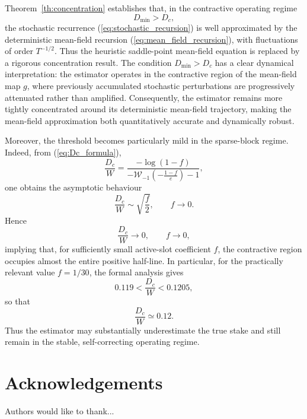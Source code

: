 \documentclass[10pt]{iopart}
\newcommand{\1}{\mathbf{1}}
\begin{document}
Theorem~\ref{th:concentration} establishes that, in the contractive operating regime
\[
D_{\min}>D_c,
\]
the stochastic recurrence (\ref{eq:stochastic_recursion}) is well approximated by the deterministic mean-field recursion (\ref{eq:mean_field_recursion}), with fluctuations of order $T^{-1/2}$. Thus the heuristic saddle-point mean-field equation is replaced by a rigorous concentration result. The condition $D_{\min}>D_c$ has a clear dynamical interpretation: the estimator operates in the contractive region of the mean-field map $g$, where previously accumulated stochastic perturbations are progressively attenuated rather than amplified. Consequently, the estimator remains more tightly concentrated around its deterministic mean-field trajectory, making the mean-field approximation both quantitatively accurate and dynamically robust.

Moreover, the threshold becomes particularly mild in the sparse-block regime. Indeed, from (\ref{eq:Dc_formula}),
\begin{equation}
\frac{D_c}{W}
=
\frac{
-\log(1-f)
}{
-\mathcal W_{-1}\!\left(-\frac{1-f}{e}\right)-1
},
\label{eq:Dc_over_W}
\end{equation}
one obtains the asymptotic behaviour
\begin{equation}
\frac{D_c}{W}
\sim
\sqrt{\frac{f}{2}},
\qquad
f\rightarrow0.
\label{eq:Dc_asymptotic}
\end{equation}
Hence
\begin{equation}
\frac{D_c}{W}\rightarrow0,
\qquad
f\rightarrow0,
\label{eq:Dc_limit}
\end{equation}
implying that, for sufficiently small active-slot coefficient $f$, the contractive region occupies almost the entire positive half-line. In particular, for the practically relevant value $f=1/30$, the formal analysis gives
\begin{equation}
0.119
<
\frac{D_c}{W}
<
0.1205,
\label{eq:Dc_numerical}
\end{equation}
so that
\[
\frac{D_c}{W}\simeq 0.12.
\]
Thus the estimator may substantially underestimate the true stake and still remain in the stable, self-correcting operating regime.
\section*{Acknowledgements}
Authors would like to thank... 

\appendix
\end{document}
